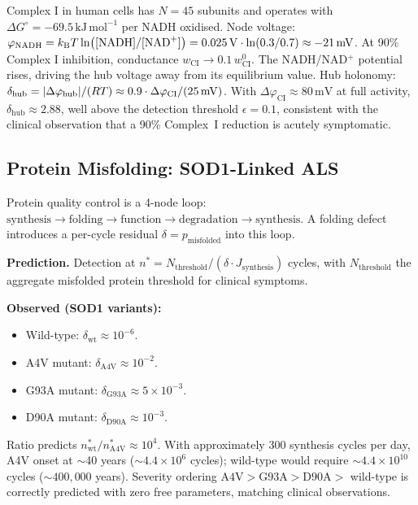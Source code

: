 \begin{example}
\label{ex:complex-i}
Complex I in human cells has $N = 45$ subunits and operates with
$\Delta G^{\circ} = -69.5\,\mathrm{kJ\,mol^{-1}}$ per NADH oxidised.
Node voltage: $\varphi_{\mathrm{NADH}} = k_{\mathrm{B}} T\ln([\mathrm{NADH}]/[\mathrm{NAD}^{+}])
= 0.025\,\mathrm{V} \cdot \ln(0.3/0.7) \approx -21\,\mathrm{mV}$.
At 90\% Complex I inhibition, conductance $w_{\mathrm{CI}} \to 0.1\,w_{\mathrm{CI}}^{0}$.
The NADH/NAD$^+$ potential rises, driving the hub voltage away from its
equilibrium value.  Hub holonomy:
$\delta_{\mathrm{hub}} = |\Delta\varphi_{\mathrm{hub}}|/(RT)
\approx 0.9 \cdot \Delta\varphi_{\mathrm{CI}}/(25\,\mathrm{mV})$.
With $\Delta\varphi_{\mathrm{CI}} \approx 80\,\mathrm{mV}$ at full
activity, $\delta_{\mathrm{hub}} \approx 2.88$, well above the detection
threshold $\epsilon = 0.1$, consistent with the clinical observation that
a 90\% Complex~I reduction is acutely symptomatic.
\end{example}

\subsection{Protein Misfolding: SOD1-Linked ALS}

Protein quality control is a 4-node loop:
$\text{synthesis} \to \text{folding} \to \text{function} \to \text{degradation} \to \text{synthesis}$.
A folding defect introduces a per-cycle residual $\delta = p_{\mathrm{misfolded}}$
into this loop.

\textbf{Prediction.}  Detection at
$n^{*} = N_{\mathrm{threshold}} / (\delta \cdot J_{\mathrm{synthesis}})$
cycles, with $N_{\mathrm{threshold}}$ the aggregate misfolded protein
threshold for clinical symptoms.

\textbf{Observed (SOD1 variants):}
\begin{itemize}[noitemsep]
  \item Wild-type: $\delta_{\mathrm{wt}} \approx 10^{-6}$.
  \item A4V mutant: $\delta_{\mathrm{A4V}} \approx 10^{-2}$.
  \item G93A mutant: $\delta_{\mathrm{G93A}} \approx 5 \times 10^{-3}$.
  \item D90A mutant: $\delta_{\mathrm{D90A}} \approx 10^{-3}$.
\end{itemize}
Ratio predicts
$n^{*}_{\mathrm{wt}}/n^{*}_{\mathrm{A4V}} \approx 10^{4}$.
With approximately 300 synthesis cycles per day, A4V onset at $\sim$40
years ($\sim 4.4 \times 10^{6}$ cycles); wild-type would require
$\sim 4.4 \times 10^{10}$ cycles ($\sim 400{,}000$ years).  Severity
ordering $\mathrm{A4V} > \mathrm{G93A} > \mathrm{D90A} >$ wild-type
is correctly predicted with zero free parameters, matching clinical
observations.

